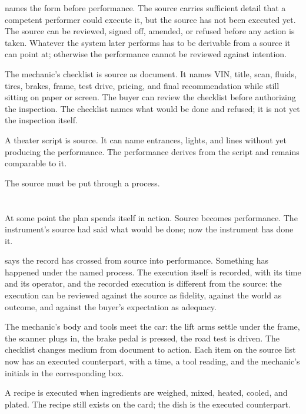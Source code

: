  names the form before performance. The source carries
sufficient detail that a competent performer could execute it, but the
source has not been executed yet. The source can be reviewed, signed
off, amended, or refused before any action is taken. Whatever the system
later performs has to be derivable from a source it can point at;
otherwise the performance cannot be reviewed against intention.

The mechanic's checklist is source as document. It names VIN, title,
scan, fluids, tires, brakes, frame, test drive, pricing, and final
recommendation while still sitting on paper or screen. The buyer can
review the checklist before authorizing the inspection. The checklist
names what would be done and refused; it is not yet the inspection
itself.

A theater script is source. It can name entrances, lights, and lines
without yet producing the performance. The performance derives from the
script and remains comparable to it.

The source must be put through a process.

\section{}
\label{se:executed}

At some point the plan spends itself in action. Source becomes
performance. The instrument's source had said what would be done; now
the instrument has done it.

 says the record has crossed from source into
performance. Something has happened under the named process. The
execution itself is recorded, with its time and its operator, and the
recorded execution is different from the source: the execution can be
reviewed against the source as fidelity, against the world as outcome,
and against the buyer's expectation as adequacy.

The mechanic's body and tools meet the car: the lift arms settle under
the frame, the scanner plugs in, the brake pedal is pressed, the road
test is driven. The checklist changes medium from document to action.
Each item on the source list now has an executed counterpart, with a
time, a tool reading, and the mechanic's initials in the corresponding
box.

A recipe is executed when ingredients are weighed, mixed, heated,
cooled, and plated. The recipe still exists on the card; the dish is
the executed counterpart.

